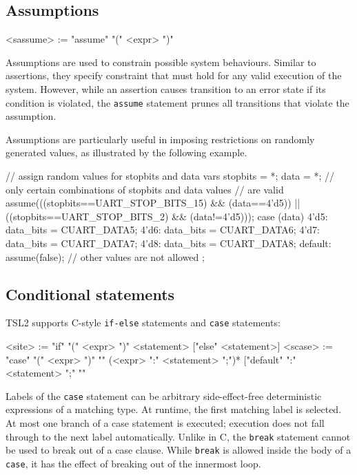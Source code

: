 \documentclass{report}
\newcommand{\src}[1]{\texttt{#1}}
\newcommand{\tsl}{TSL2 }
\begin{document}
\subsection{Assumptions}  

\begin{bnflisting}{}
<sassume> := "assume" "(" <expr> ")"
\end{bnflisting}

Assumptions are used to constrain possible system behaviours.  
Similar to assertions, they specify constraint that must hold for 
any valid execution of the system.  However, while an assertion 
causes transition to an error state if its condition is violated, 
the \src{assume} statement prunes all transitions that violate the 
assumption.

Assumptions are particularly useful in imposing restrictions on 
randomly generated values, as illustrated by the following 
example.
\begin{tsllisting}{}
// assign random values for stopbits and data vars
stopbits  = *;
data      = *;
// only certain combinations of stopbits and data values 
// are valid
assume(((stopbits==UART_STOP_BITS_15) && (data==4'd5)) || 
        ((stopbits==UART_STOP_BITS_2) && (data!=4'd5)));
case (data) {
    4'd5:       data_bits = CUART_DATA5;
    4'd6:       data_bits = CUART_DATA6;
    4'd7:       data_bits = CUART_DATA7;
    4'd8:       data_bits = CUART_DATA8;
    default: assume(false); // other values are not allowed
};
\end{tsllisting}

\subsection{Conditional statements}

\tsl supports C-style \src{if-else} statements and \src{case} 
statements:
\begin{bnflisting}{}
<site>  := "if" "(" <expr> ")" <statement>
             ["else" <statement>]
<scase> := "case" "(" <expr> ")" "{"
             (<expr> ":" <statement> ";")*
             ["default" ":" <statement> ";"
           "}"
\end{bnflisting}

Labels of the \src{case} statement can be arbitrary 
side-effect-free deterministic expressions of a matching type.  At 
runtime, the first matching label is selected.  At most one branch 
of a case statement is executed; execution does not fall through 
to the next label automatically.  Unlike in C, the \src{break} 
statement cannot be used to break out of a case clause.  While 
\src{break} is allowed inside the body of a \src{case}, it has the 
effect of breaking out of the innermost loop.
\end{document}
